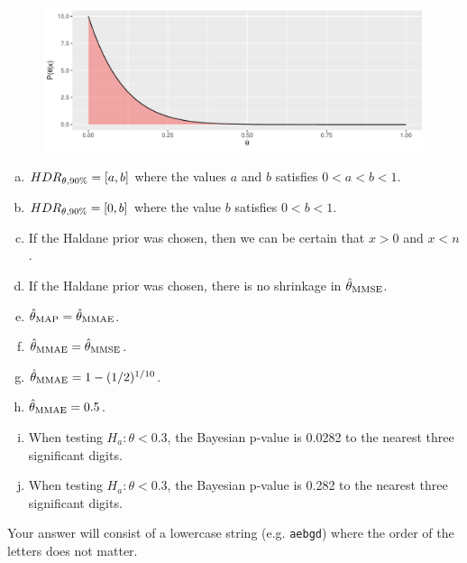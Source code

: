 \documentclass[12pt,landscape]{article}
\newcommand{\instr}{\small Your answer will consist of a lowercase string (e.g. \texttt{aebgd}) where the order of the letters does not matter. \normalsize}
\begin{document}

\begin{figure}[htp]
\centering
\includegraphics[width = 6.5in]{beta.pdf}
\end{figure}

\vspace{-0.2cm}\benum{} 

\begin{enumerate}[(a)]
\item $HDR_{\theta, 90\%} = \left[a, b\right]$ where the values $a$ and $b$ satisfies $0 < a < b < 1$.
\item $HDR_{\theta, 90\%} = \left[0, b\right]$ where the value $b$ satisfies $0 < b < 1$.
\item If the Haldane prior was chosen, then we can be certain that $x > 0$ and $x < n$.
\item If the Haldane prior was chosen, there is no shrinkage in $\hat{\theta}_{\mathrm{MMSE}}$.
\item $\hat{\theta}_{\mathrm{MAP}} = \hat{\theta}_{\mathrm{MMAE}}$.
\item $\hat{\theta}_{\mathrm{MMAE}} = \hat{\theta}_{\mathrm{MMSE}}$.
\item $\hat{\theta}_{\mathrm{MMAE}} = 1 - (1/2)^{1/10}$.
\item $\hat{\theta}_{\mathrm{MMAE}} = 0.5$.
\item When testing $H_a: \theta < 0.3$, the Bayesian p-value is 0.0282 to the nearest three significant digits.
\item When testing $H_a: \theta < 0.3$, the Bayesian p-value is 0.282 to the nearest three significant digits.
\end{enumerate}
\eenum\instr\pagebreak

\end{document}
